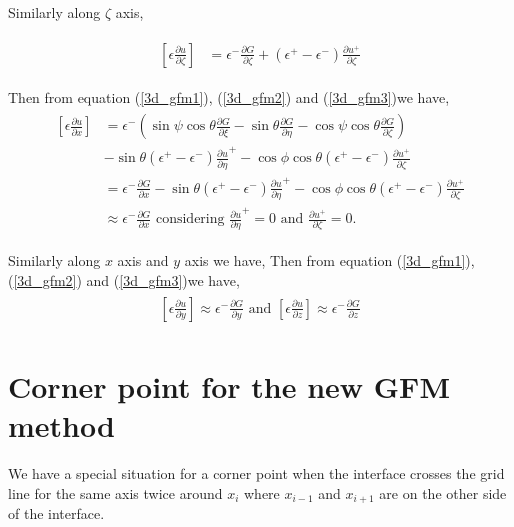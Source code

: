     Similarly along $\zeta $ axis, 
    
    \begin{eqnarray}
    \begin{aligned}
    \left[\epsilon \frac{\partial u}{\partial \zeta}\right]&= \epsilon^-\frac{\partial G}{\partial \zeta}+(\epsilon^+-\epsilon^-)\frac{\partial u^+}{\partial \zeta }\label{3d_gfm3}
    \end{aligned}
    \end{eqnarray}

    Then from equation (\ref{3d_gfm1}), (\ref{3d_gfm2}) and (\ref{3d_gfm3})we have,
    \begin{eqnarray}
    \begin{aligned}   
    		\left[\epsilon \frac{\partial u}{\partial x}\right]&= \epsilon^-\left( \sin \psi \cos \theta \frac{\partial G}{\partial \xi}-\sin \theta \frac{\partial G}{\partial \eta}-\cos \psi \cos \theta \frac{\partial G}{\partial \zeta}\right)\\
    		 &-\sin\theta (\epsilon^+-\epsilon^-)\frac{\partial u}{\partial \eta}^+ -\cos{\phi} \cos \theta (\epsilon^+-\epsilon^-) \frac{\partial u^+}{\partial \zeta }\\
    		 &=\epsilon^- \frac{\partial G}{\partial x}-\sin\theta (\epsilon^+-\epsilon^-)\frac{\partial u}{\partial \eta}^+ -\cos{\phi} \cos \theta (\epsilon^+-\epsilon^-) \frac{\partial u^+}{\partial \zeta }\\
    		 &\approx \epsilon^- \frac{\partial G}{\partial x}\text{     considering } \frac{\partial u}{\partial \eta}^+ =0 \text{ and } \frac{\partial u^+}{\partial \zeta }=0.  
    \end{aligned}\label{eq:m-gfm1}		  	
    \end{eqnarray}

  Similarly along $x$ axis and $y$ axis we have, 
  Then from equation (\ref{3d_gfm1}), (\ref{3d_gfm2}) and (\ref{3d_gfm3})we have,
    \begin{eqnarray}
    \begin{aligned}  
   \left[\epsilon \frac{\partial u}{\partial y}\right]\approx\epsilon^- \frac{\partial G}{\partial y}\text{ and } \left[\epsilon \frac{\partial u}{\partial z}\right]\approx\epsilon^- \frac{\partial G}{\partial z}\label{eq:m-gfm2}
    \end{aligned}		  	
    \end{eqnarray}

\section{Corner point for the new GFM method}
We have a special situation for a corner point when the interface crosses the grid line for the same axis twice around $x_i$ where $x_{i-1}$ and $x_{i+1}$ are on the other side of the interface.   
		
